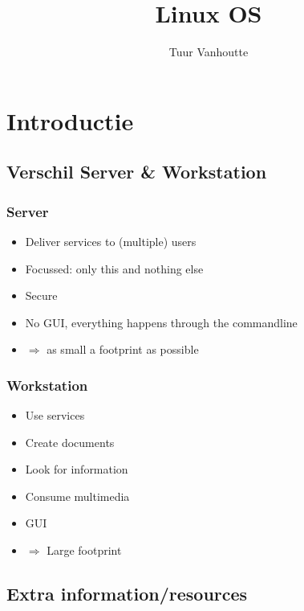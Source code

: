 \documentclass{article}
\begin{document}
\begin{titlepage}
    \author{Tuur Vanhoutte}
    \title{Linux OS}
\end{titlepage}

\maketitle
\newpage
\tableofcontents
\newpage


\section{Introductie}

\subsection{Verschil Server \& Workstation}

\subsubsection{Server}

\begin{itemize}
    \item Deliver services to (multiple) users
    \item Focussed: only this and nothing else
    \item Secure
    \item No GUI, everything happens through the commandline
    \item $\Rightarrow$ as small a footprint as possible
\end{itemize}

\subsubsection{Workstation}

\begin{itemize}
    \item Use services
    \item Create documents
    \item Look for information
    \item Consume multimedia
    \item GUI
    \item $\Rightarrow$ Large footprint
\end{itemize}

\subsection{Extra information/resources}
\end{document}
